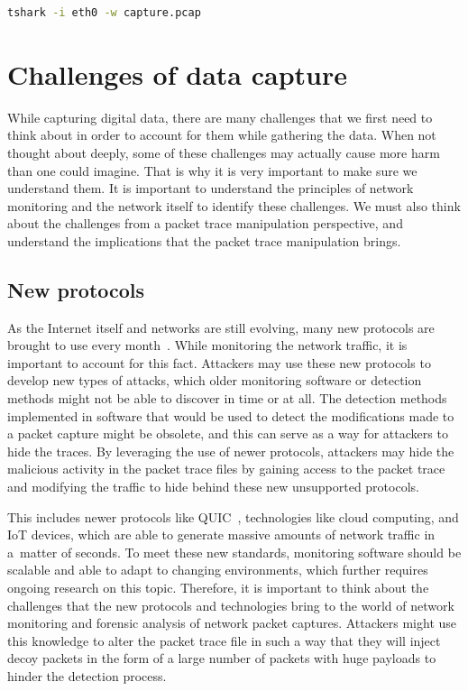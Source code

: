 \documentclass[
  printed,     %
  color,       %
  oneside,     %
  nosansbold,  %
  nocolorbold, %
  nolof,         %
  nolot,         %
]{fithesis4}
\begin{document}
\begin{lstlisting}[language=bash, caption={Save capture to pcap file}, label={lst:tsharksave}]
tshark -i eth0 -w capture.pcap
\end{lstlisting}



\section{Challenges of data capture}

While capturing digital data, there are many challenges that we first need to think about in order to account for them while gathering the data. When not thought about deeply, some of these challenges may actually cause more harm than one could imagine. That is why it is very important to make sure we understand them. It is important to understand the principles of network monitoring and the network itself to identify these challenges. We must also think about the challenges from a packet trace manipulation perspective, and understand the implications that the packet trace manipulation brings.

\subsection{New protocols}

As the Internet itself and networks are still evolving, many new protocols are brought to use every month~\cite{Examinin23:online}. While monitoring the network traffic, it is important to account for this fact. Attackers may use these new protocols to develop new types of attacks, which older monitoring software or detection methods might not be able to discover in time or at all. The detection methods implemented in software that would be used to detect the modifications made to a packet capture might be obsolete, and this can serve as a way for attackers to hide the traces. By leveraging the use of newer protocols, attackers may hide the malicious activity in the packet trace files by gaining access to the packet trace and modifying the traffic to hide behind these new unsupported protocols.

This includes newer protocols like QUIC~\cite{RFC9000}, technologies like cloud computing, and IoT devices, which are able to generate massive amounts of network traffic in a~matter of seconds. To meet these new standards, monitoring software should be scalable and able to adapt to changing environments, which further requires ongoing research on this topic. Therefore, it is important to think about the challenges that the new protocols and technologies bring to the world of network monitoring and forensic analysis of network packet captures. Attackers might use this knowledge to alter the packet trace file in such a way that they will inject decoy packets in the form of a large number of packets with huge payloads to hinder the detection process.
\end{document}
